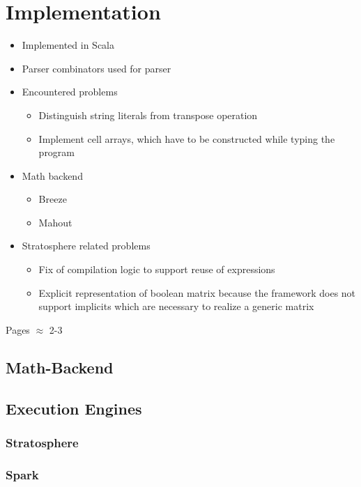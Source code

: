 \chapter{Implementation}
\label{cha:implementation}

\begin{itemize}
	\item Implemented in Scala
	\item Parser combinators used for parser
	\item Encountered problems
	\begin{itemize}
		\item Distinguish string literals from transpose operation
		\item Implement cell arrays, which have to be constructed while typing the program
	\end{itemize}
	\item Math backend
	\begin{itemize}
		\item Breeze
		\item Mahout
	\end{itemize}
	\item Stratosphere related problems
	\begin{itemize}
		\item Fix of compilation logic to support reuse of expressions
		\item Explicit representation of boolean matrix because the framework does not support implicits which are necessary to realize a generic matrix
	\end{itemize}
\end{itemize}

Pages $\approx$ 2-3

\section{Math-Backend}

\section{Execution Engines}

\subsection{Stratosphere}

\subsection{Spark}